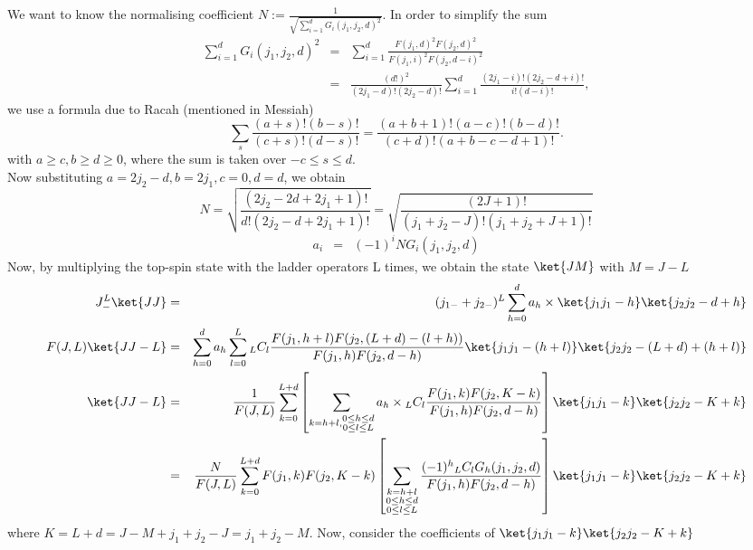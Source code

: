 \documentclass{article}
\begin{document}
We want to know the normalising coefficient $N := \frac{1}{\sqrt{\sum_{i=1}^{d}G_i(j_1,j_2,d)^2}}$. In order to simplify the sum
\begin{eqnarray}
\sum_{i=1}^{d}G_i(j_1,j_2,d)^2 &=& \sum_{i=1}^{d}\frac{F(j_1,d)^2F(j_2,d)^2}{F(j_1,i)^2F(j_2,d-i)^2} \nonumber \\
 & = & \frac{(d!)^2}{(2j_1-d)!(2j_2-d)!} \sum_{i=1}^{d}\frac{(2j_1-i)!(2j_2-d+i)!}{i!(d-i)!},
\end{eqnarray} 
we use a formula due to Racah (mentioned in Messiah\cite{Messiah})
\begin{equation}
\label{eq:general_binomial_coeff}
\sum_{s} \frac{(a+s)!(b-s)!}{(c+s)!(d-s)!} = \frac{(a+b+1)!(a-c)!(b-d)!}{(c+d)!(a+b-c-d+1)!}.
\end{equation}
with $a\ge c, b\ge d \ge 0$, where the sum is taken over $-c\le s \le d$.\\
Now substituting $a = 2j_2-d, b = 2j_1, c=0, d= d$, we obtain
\begin{equation}
\label{ }
N = \sqrt{\frac{(2j_2-2d+2j_1+1)!}{d!(2j_2-d+2j_1+1)!}} = \sqrt{\frac{(2J+1)!}{(j_1+j_2 -J)!(j_1+j_2+J+1)!}}
\end{equation}
\begin{eqnarray}
a_i & = &  (-1)^iNG_i(j_1,j_2,d)\nonumber
\end{eqnarray}
Now, by multiplying the top-spin state with the ladder operators L times, we obtain the state $\ket{JM}$ with $M=J-L$
\begin{eqnarray}
J_{-}^L\ket{JJ} & = & (j_{1-} + j_{2-})^L\sum_{h=0}^{d}a_h\times \ket{j_1j_1 -h}\ket{j_2j_2-d+h} \nonumber\\
F(J,L)\ket{JJ-L}&=& \sum_{h=0}^{d}a_h\sum_{l=0}^{L}{}_LC_{l}\frac{F(j_1,h+l)F(j_2,(L+d)-(l+h))}{F(j_1,h)F(j_2,d-h)}\ket{j_1j_1 -(h + l)}\ket{j_2j_2 - (L+d) + (h + l)}  \nonumber\\
\ket{JJ-L}&=& \frac{1}{F(J,L)} \sum_{k=0}^{L+d} \left[ \sum_{k=h+l,\substack{0\le h \le d\\0\le l \le L}} a_h \times {}_LC_{l}\frac{F(j_1,k)F(j_2,K-k)}{F(j_1,h)F(j_2,d-h)}\right] \ket{j_1j_1 -k}\ket{j_2j_2 - K + k}  \nonumber\\
         &=& \frac{N}{F(J,L)} \sum_{k=0}^{L+d} F(j_1,k)F(j_2,K-k) \left[ \sum_{\substack{k=h+l\\0\le h \le d\\0\le l \le L}} \frac{ (-1)^h {}_LC_{l}G_h(j_1,j_2,d) }{F(j_1,h)F(j_2,d-h)}\right] \ket{j_1j_1 -k}\ket{j_2j_2 - K + k}  \nonumber
\end{eqnarray}
where $K=L+d = J- M + j_1 + j_2 -J = j_1 +j_2 -M$. Now, consider the coefficients of $\ket{j_1j_1 -k}\ket{j_2j_2 - K + k}$
\end{document}
